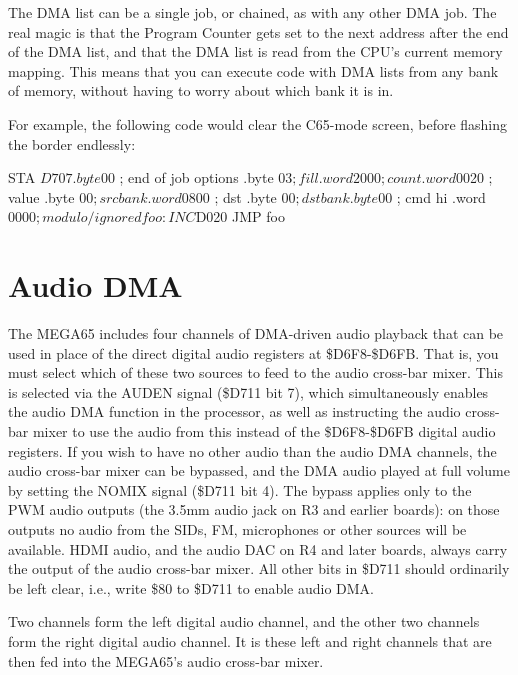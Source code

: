 The DMA list can be a single job, or chained, as with any other DMA job. The
real magic is that the Program Counter gets set to the next address after the end of the DMA list, and that
the DMA list is read from the CPU's current memory mapping. This means that you can execute code with DMA lists
from any bank of memory, without having to worry about which bank it is in.

For example, the following code would clear the C65-mode screen, before flashing the border endlessly:

\begin{asmcode}
  STA $D707
  .byte $00   ; end of job options
  .byte $03   ; fill
  .word 2000  ; count
  .word $0020 ; value
  .byte $00   ; src bank
  .word $0800 ; dst
  .byte $00   ; dst bank
  .byte $00   ; cmd hi
  .word $0000 ; modulo / ignored
foo:
  INC $D020
  JMP foo
\end{asmcode}

\section{Audio DMA}
The MEGA65 includes four channels of DMA-driven audio playback that can be used in place of the direct digital
audio registers at \$D6F8-\$D6FB.  That is, you must select which of these two sources to feed to the audio
cross-bar mixer.  This is selected via the AUDEN signal (\$D711 bit 7), which simultaneously enables the audio DMA
function in the processor, as well as instructing the audio cross-bar mixer to use the audio from this instead
of the \$D6F8-\$D6FB digital audio registers. If you wish to have no
other audio than the audio DMA channels, the audio cross-bar mixer can
be bypassed, and the DMA audio played at full volume by setting the
NOMIX signal (\$D711 bit 4).  The bypass applies only to the PWM audio
outputs (the 3.5mm audio jack on R3 and earlier boards): on those
outputs no audio from the SIDs, FM, microphones or other sources will
be available.  HDMI audio, and the audio DAC on R4 and later boards,
always carry the output of the audio cross-bar mixer.
All other bits in
\$D711 should ordinarily be left clear, i.e., write \$80 to \$D711 to
enable audio DMA.

Two channels form the left digital audio channel, and the other two
channels form the right digital audio channel. It is these left and
right channels that are then fed into the MEGA65's audio cross-bar
mixer.

